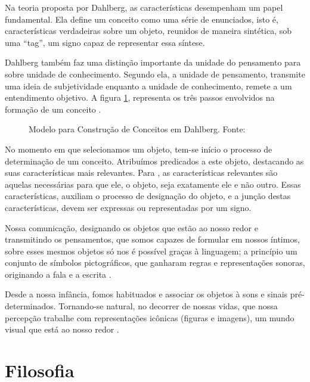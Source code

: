 Na teoria proposta por Dahlberg, as características desempenham um papel fundamental. Ela define um conceito como uma série de enunciados, isto é, características verdadeiras sobre um objeto, reunidos de maneira sintética, sob uma ``tag'', um signo capaz de representar essa síntese.

Dahlberg também faz uma distinção importante da unidade do pensamento para sobre unidade de conhecimento. Segundo ela, a unidade de pensamento, transmite uma ideia de subjetividade enquanto a unidade de conhecimento, remete a um entendimento objetivo. A figura \ref{fig:conceito_dahlberg}, representa os três passos envolvidos na formação de um conceito \cite{campos:2001.organizacao}.

\begin{figure}
    \centering
    \caption{Modelo para Construção de Conceitos em Dahlberg. Fonte: }
    \label{fig:conceito_dahlberg}
\end{figure}

No momento em que selecionamos um objeto, tem-se início o processo de determinação de um conceito. Atribuímos predicados a este objeto, destacando as suas características mais relevantes. Para , as características relevantes são aquelas necessárias para que ele, o objeto, seja exatamente ele e não outro. Essas características, auxiliam o processo de designação do objeto, e a junção destas características, devem ser expressas ou representadas por um signo. 

Nossa comunicação, designando os objetos que estão ao nosso redor e transmitindo os pensamentos, que somos capazes de formular em nossos íntimos, sobre esses mesmos objetos só nos é possível graças à linguagem; a princípio um conjunto de símbolos pictográficos, que ganharam regras e representações sonoras, originando a fala e a escrita \cite{dahlberg:1978.teoria}.

Desde a nossa infância, fomos habituados e associar os objetos à sons e sinais pré-determinados. Tornando-se natural, no decorrer de nossas vidas, que nossa percepção trabalhe com representações icônicas (figuras e imagens), um mundo visual que está ao nosso redor .

\section{\hspace*{3pt} Filosofia}

